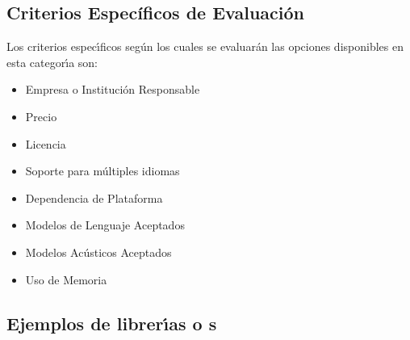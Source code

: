 \subsection{Criterios Espec\'ificos de Evaluaci\'on}

Los criterios espec{\'\i}ficos seg\'un los cuales se evaluar\'an las opciones disponibles en esta
categor{\'\i}a son:

\begin{itemize}
	\item Empresa o Instituci\'on Responsable
	\item Precio
	\item Licencia
	\item Soporte para m\'ultiples idiomas
	\item Dependencia de Plataforma
	\item Modelos de Lenguaje Aceptados
	\item Modelos Ac\'usticos Aceptados
	\item Uso de Memoria
\end{itemize}


\subsection{Ejemplos de librer{\'\i}as o s}






